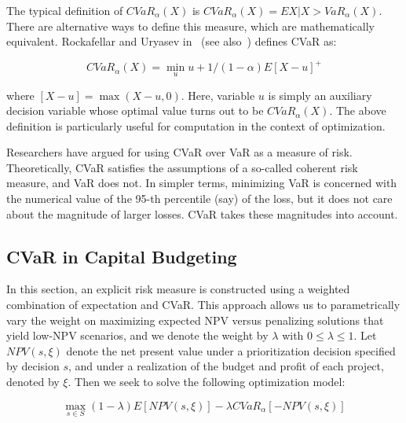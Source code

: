 The typical definition of $CVaR_\alpha (X)$ is $CVaR_\alpha (X) = E{X|X > VaR_\alpha (X)}$.
There are alternative ways to define this measure, which are mathematically equivalent.
Rockafellar and Uryasev in~\cite{OptCVaR} (see also~\cite{RemarksCVaR}) defines CVaR as:

\begin{equation}
CVaR_\alpha (X) = \min_u {u + 1/(1-\alpha) E[X-u]^+}
\end{equation}

where $[X-u] = \max (X - u, 0)$. Here, variable $u$ is simply an auxiliary decision
variable whose optimal value turns out to be $CVaR_\alpha (X)$. The above definition
is particularly useful for computation in the context of optimization.

Researchers have argued for using CVaR over VaR as a measure of risk. Theoretically,
CVaR satisfies the assumptions of a so-called coherent risk measure, and VaR does not.
In simpler terms, minimizing VaR is concerned with the numerical value of the 95-th
percentile (say) of the loss, but it does not care about the magnitude of larger losses.
CVaR takes these magnitudes into account.

\subsection{CVaR in Capital Budgeting}
\label{CVaRCapitalBudgeting}
In this section, an explicit risk measure is constructed using a weighted
combination of expectation and CVaR. This approach allows us to parametrically
vary the weight on maximizing expected NPV versus penalizing solutions that yield
low-NPV scenarios, and we denote the weight by $\lambda$ with $0 \le \lambda \le 1$.
Let $NPV(s,\xi)$ denote the net present value under a prioritization decision
specified by decision $s$, and under a realization of the budget and profit of
each project, denoted by $\xi$. Then we seek to solve the following optimization
model:

\begin{equation}
\max_{s\in S} (1-\lambda)E[NPV(s, \xi)] - \lambda CVaR_\alpha [-NPV(s, \xi)]
\end{equation}

